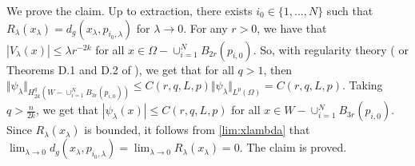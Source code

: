 \documentclass[reqno]{amsart}
\begin{document}
\smallskip\noindent We prove the claim. Up to extraction, there exists $i_0\in \{1,...,N\}$ such that $R_\lambda(x_\lambda)=d_g(x_\lambda, p_{i_0,\lambda})$ for $\lambda\to 0$. For any $r>0$, we have that $|V_\lambda(x)|\leq \lambda r^{-2k}$ for all $x\in \Omega- \cup_{i=1}^NB_{2r}(p_{i,0})$. So, with regularity theory (\cite{ADN} or Theorems D.1 and D.2 of \cite{robert:gjms}), we get that for all $q>1$, then $\Vert \psi_\lambda\Vert_{H_{2k}^q(W- \cup_{i=1}^N B_{3r}(p_{i,0}))}\leq C(r, q, L,p)\Vert\psi_\lambda\Vert_{L^p(\Omega)}=C(r,q, L,p)$. Taking $q>\frac{n}{2k}$, we get that $|\psi_\lambda(x)|\leq C(r,q, L,p)$ for all $x\in W- \cup_{i=1}^NB_{3r}(p_{i,0})$. Since $R_\lambda(x_\lambda)$ is bounded, it follows from \eqref{lim:xlambda} that $\lim_{\lambda\to 0}d_g(x_\lambda, p_{i_0,\lambda})=\lim_{\lambda\to 0}R_\lambda(x_\lambda)=0$. The claim is proved.
\end{document}
